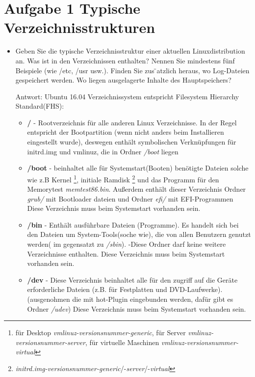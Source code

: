 \section{Aufgabe 1 Typische Verzeichnisstrukturen}
	\begin{itemize}
		\item Geben Sie die typische Verzeichnisstruktur einer aktuellen Linuxdistribution an. Was ist
		in den Verzeichnissen enthalten? Nennen Sie mindestens fünf Beispiele (wie /etc, /usr
		usw.). Finden Sie zus ̈atzlich heraus, wo Log-Dateien gespeichert werden.
		Wo liegen ausgelagerte Inhalte des Hauptspeichers?

		Antwort: Ubuntu 16.04 Verzeichnissystem entspricht Filesystem Hierarchy Standard(FHS):

		\begin{itemize}
			\item \textbf{/} - Rootverzeichnis für alle anderen Linux Verzeichnisse.
			 In der Regel entspricht der Bootpartition (wenn nicht anders beim Installieren eingestellt wurde),
			 deswegen enthält  symbolischen Verknüpfungen für initrd.img und vmlinuz,
			 die in Ordner \textit{/boot} liegen
			 \item \textbf{/boot} - beinhaltet alle für Systemstart(Booten) benötigte Dateien
			 solche wie z.B Kernel \footnote{
			 für Desktop \textit{vmlinuz-versionsnummer-generic},
			 für Server \textit{vmlinuz-versionsnummer-server},
			 für virtuelle Maschinen \textit{vmlinuz-versionsnummer-virtual}
			 }, initiale Ramdisk \footnote{
			 \textit{initrd.img-versionsnummer-generic}/-\textit{server}/-\textit{virtual}}
			 und das Programm für den Memorytest \textit{memtest86.bin}.
			 Außerdem enthält dieser Verzeichnis Ordner \textit{grub/} mit Bootloader dateien
			 und Ordner \textit{efi/} mit EFI-Programmen
			 Diese Verzeichnis muss beim Systemstart vorhanden sein.
			\item \textbf{/bin} - Enthält ausführbare Dateien (Programme).
			Es handelt sich bei den Dateien um System-Tools(soche wie), die von allen Benutzern
			genutzt werden( im gegensatzt zu \textit{/sbin}). -Diese Ordner darf keine
			weitere Verzeichnisse enthalten. Diese Verzeichnis muss beim Systemstart vorhanden sein.
			\item \textbf{/dev} - Diese Verzeichnis beinhaltet alle für den zugriff
			auf die Geräte erforderliche Dateien (z.B. für  Festplatten und DVD-Laufwerke).
			(ausgenohmen die mit hot-Plugin eingebunden werden, dafür gibt es Ordner \textit{/udev})
			Diese Verzeichnis muss beim Systemstart vorhanden sein.

\end{itemize}
\end{itemize}
